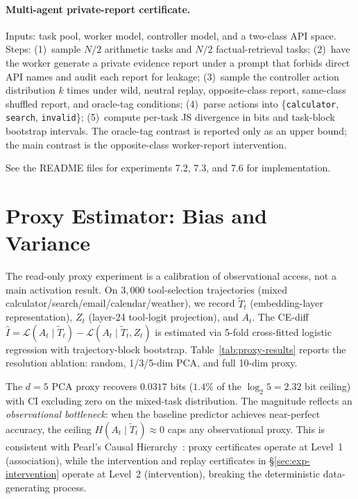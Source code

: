 \documentclass{article}
\begin{document}
\paragraph{Multi-agent private-report certificate.} Inputs: task pool, worker model, controller model, and a two-class API space. Steps: (1)~sample $N/2$ arithmetic tasks and $N/2$ factual-retrieval tasks; (2)~have the worker generate a private evidence report under a prompt that forbids direct API names and audit each report for leakage; (3)~sample the controller action distribution $k$ times under wild, neutral replay, opposite-class report, same-class shuffled report, and oracle-tag conditions; (4)~parse actions into \{\texttt{calculator}, \texttt{search}, \texttt{invalid}\}; (5)~compute per-task JS divergence in bits and task-block bootstrap intervals. The oracle-tag contrast is reported only as an upper bound; the main contrast is the opposite-class worker-report intervention.

See the README files for experiments 7.2, 7.3, and 7.6 for implementation.

\section{Proxy Estimator: Bias and Variance}
\label{app:proxy-bias}

The read-only proxy experiment is a calibration of observational access, not a main activation result. On $3{,}000$ tool-selection trajectories (mixed calculator/search/email/calendar/weather), we record $\tilde T_t$ (embedding-layer representation), $Z_t$ (layer-24 tool-logit projection), and $A_t$. The CE-diff $\hat I = \mathcal{L}(A_t\mid\tilde T_t) - \mathcal{L}(A_t\mid\tilde T_t,Z_t)$ is estimated via 5-fold cross-fitted logistic regression with trajectory-block bootstrap. Table~\ref{tab:proxy-results} reports the resolution ablation: random, 1/3/5-dim PCA, and full 10-dim proxy.

The $d{=}5$ PCA proxy recovers $0.0317$ bits ($1.4\%$ of the $\log_2 5 = 2.32$ bit ceiling) with CI excluding zero on the mixed-task distribution. The magnitude reflects an \emph{observational bottleneck}: when the baseline predictor achieves near-perfect accuracy, the ceiling $H(A_t \mid \tilde T_t) \approx 0$ caps any observational proxy. This is consistent with Pearl's Causal Hierarchy~\citep{pearl2009causality}: proxy certificates operate at Level~1 (association), while the intervention and replay certificates in \S\ref{sec:exp-intervention} operate at Level~2 (intervention), breaking the deterministic data-generating process.
\end{document}
